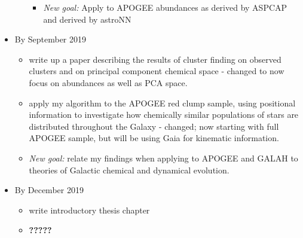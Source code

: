 \documentclass[11pt]{article}
\begin{document}
\begin{itemize}
\begin{itemize}
\begin{itemize}
\item \emph{New goal:} {\color{ForestGreen} Apply to APOGEE abundances as derived by ASPCAP \citep{Holtzman2015} and derived by astroNN \citep{Leung2018}}
\end{itemize} 
\end{itemize}
\item By September 2019
\begin{itemize}
\item {\color{ForestGreen} write up a paper describing the results of cluster finding on observed clusters and on principal component chemical space} - changed to now focus on abundances as well as PCA space.
\item {\color{ForestGreen} apply my algorithm to the APOGEE red clump sample, using positional information to investigate how chemically similar populations of stars are distributed throughout the Galaxy} - changed; now starting with full APOGEE sample, but will be using Gaia for kinematic information.
\item \emph{New goal:} relate my findings when applying to APOGEE and GALAH to theories of Galactic chemical and dynamical evolution.
\end{itemize}
\item By December 2019
\begin{itemize}
\item write introductory thesis chapter
\item \textbf{?????}
\end{itemize}
\end{itemize}
\end{document}
